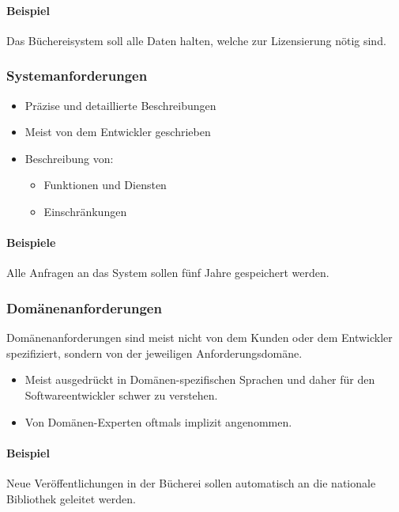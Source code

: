 				\paragraph{Beispiel}
					Das Büchereisystem soll alle Daten halten, welche zur Lizensierung nötig sind.
			
			\subsubsection{Systemanforderungen}
				\begin{itemize}
					\item Präzise und detaillierte Beschreibungen
					\item Meist von dem Entwickler geschrieben
					\item Beschreibung von:
						\begin{itemize}
							\item Funktionen und Diensten
							\item Einschränkungen
						\end{itemize}
				\end{itemize}
				
				\paragraph{Beispiele}
					Alle Anfragen an das System sollen fünf Jahre gespeichert werden.
			
			\subsubsection{Domänenanforderungen}
				Domänenanforderungen sind meist nicht von dem Kunden oder dem Entwickler spezifiziert, sondern von der jeweiligen Anforderungsdomäne.
				
				\begin{itemize}
					\item Meist ausgedrückt in Domänen-spezifischen Sprachen und daher für den Softwareentwickler schwer zu verstehen.
					\item Von Domänen-Experten oftmals implizit angenommen.
				\end{itemize}
				
				\paragraph{Beispiel}
					Neue Veröffentlichungen in der Bücherei sollen automatisch an die nationale Bibliothek geleitet werden.
		
